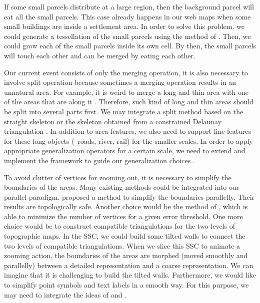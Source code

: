 \documentclass[]{interact}
\begin{document}
If some small parcels distribute at a large region,
then the background parcel will eat all the small parcels.
This case already happens in our web maps
when some small buildings are inside a settlement area.
In order to solve this problem, 
we could generate a tessellation of the small parcels
using the method of \citet{Ai2015Building}.
Then, we could grow each of the small parcels 
inside its own cell.
By then, the small parcels will touch each other
and can be merged by eating each other.

Our current event consists of only the merging operation,
it is also necessary to involve split operation
because sometimes a merging operation results in an unnatural area.
For example, it is weird to merge a long and thin area 
with one of the areas that are along it
\citep[see][]{Haunert2008Skeleton}.
Therefore, such kind of long and thin areas should be
split into several parts first.
We may integrate a split method based on the straight skeleton
\citep{Haunert2008Skeleton}
or the skeleton obtained from a constrained Delaunay triangulation
\citep{Ai2002GAP,Meijers2016Split}.
In addition to area features, we also need to support line features 
for these long objects (\eg~roads, river, rail) for the smaller scales.
In order to apply appropriate generalization operators
for a certain scale,
we need to extend and implement the framework 
to guide our generalization choices
\citep{Meijers2018Framework}.


To avoid clutter of vertices for zooming out, 
it is necessary to simplify the boundaries of the areas.
Many existing methods could be integrated into our parallel paradigm.
\citet{Meijers2011LineSimp} proposed a method 
to simplify the boundaries parallelly. 
Their results are topologically safe. 
Another choice would be the method of \citet{ImaiIri1988},
which is able to minimize the number of vertices 
for a given error threshold.
One more choice would be to construct compatible triangulations 
\citep[see][]{Peng2019Thesis}
for the two levels of topographic maps.
In the SSC, we could build some tilted walls 
to connect the two levels of compatible triangulations.
When we slice this SSC to animate a zooming action,
the boundaries of the areas are morphed 
(moved smoothly and parallelly)
between a detailed representation and a coarse representation.
We can imagine that it is challenging to build the tilted walls.
Furthermore, we would like to 
simplify point symbols and text labels in a smooth way.
For this purpose, we may need to integrate the ideas of
\citet{Haunert2017Label} and \citet{sahw-oarps-ICAGW13}.
\end{document}
